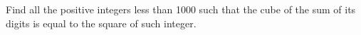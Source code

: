 Find all the positive integers less than 1000 such that the cube of the sum of its digits  is equal to the square of such integer.